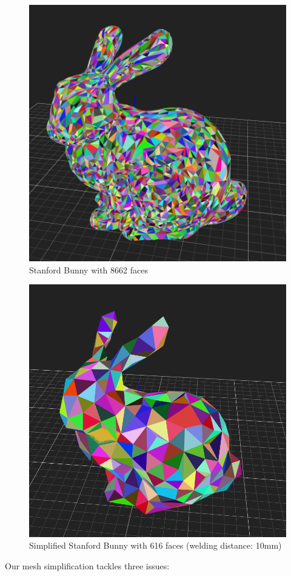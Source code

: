 \documentclass[../ClassicThesis.tex]{subfiles}
\begin{document}
\begin{figure}
\includegraphics[width=0.8\columnwidth]{Images/04-approx-welding-rabbit-original.png}
\caption{Stanford Bunny with 8662 faces}
\label{fig:origBunny}
\end{figure}

\begin{figure}
\includegraphics[width=0.8\columnwidth]{Images/04-approx-welding-rabbit-10mm.png}
\caption{Simplified Stanford Bunny with 616 faces (welding distance: 10mm)}
\label{fig:10mmBunny}
\end{figure}

Our mesh simplification tackles three issues:
\end{document}
